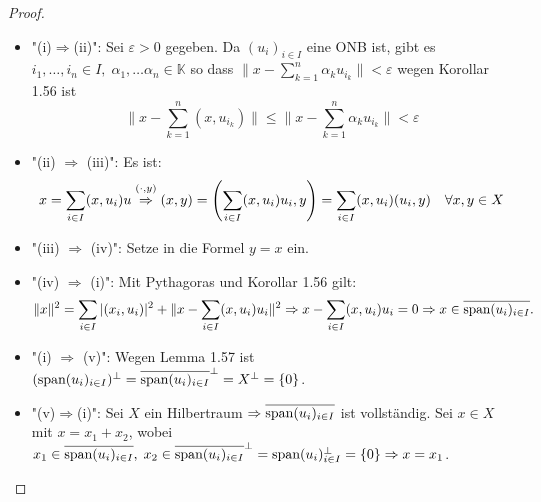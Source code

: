 \documentclass[ngerman]{report}
\theoremstyle{plain}%
\theoremstyle{definition}%
\theoremstyle{myStyle}
\newcommand{\K}{\mathbb{K}}
\newcommand{\aufspan}{\textnormal{span}}
\newcommand{\norm}[1]{\|#1\|}
\newcommand{\df}[1][]{%
	\overset{#1}{\Rightarrow}
}
\newcommand{\qmarks}[1]{"#1"}
\begin{document}
	\begin{proof}
		\begin{itemize}[]
		\item \qmarks{(i)$\df$(ii)}: Sei $\varepsilon > 0$ gegeben. Da $(u_i)_{i\in I}$ eine ONB ist, gibt es $i_1,\dots,i_n\in I,\;\alpha_1,\dots \alpha_n \in \K$ so dass $\|x- \sum^n_{k=1} \alpha_k u_{i_k}\| < \varepsilon$ wegen Korollar 1.56 ist
		$$\|x- \sum^n_{k=1} (x, u_{i_k})\| \leq \|x-\sum^n_{k=1} \alpha_k u_{i_k}\| < \varepsilon$$
		\item \qmarks{(ii) $\df$ (iii)}: Es ist:
		$$x = \sum_{i\in I} (x, u_i)u \overset{(\cdot, y)}{\df} (x,y)=\left(\sum_{i\in I} (x, u_i)u_i,y\right)=\sum_{i\in I} (x,u_i)(u_i,y)\quad \forall x,y\in X$$
		\item \qmarks{(iii) $\df$ (iv)}: Setze in die Formel $y=x$ ein.
		\item \qmarks{(iv) $\df$ (i)}: Mit Pythagoras und Korollar 1.56 gilt:
		$$\|x\|^2 = \sum_{i\in I} |(x_i,u_i)|^2 + \|x- \sum_{i\in I} (x,u_i)u_i\|^2 \df x- \sum_{i\in I} (x,u_i)u_i = 0 \df x \in \overline{\aufspan (u_i)_{i\in I}}.$$
		\item \qmarks{(i) $\df$ (v)}: Wegen Lemma 1.57 ist $(\aufspan (u_i)_{i\in I})^\perp =\overline{\aufspan (u_i)_{i\in I}}^\perp = X^\perp = \{0\}$.
		\item \qmarks{(v)$\df$(i)}: Sei $X$ ein Hilbertraum $\df \overline{\aufspan (u_i)_{i\in I}}$ ist vollständig. Sei $x\in X$ mit $x = x_1+x_2$, wobei $x_1 \in \overline{\aufspan (u_i)_{i\in I}},\;x_2\in \overline{\aufspan (u_i)_{i\in I}}^\perp =  \aufspan (u_i)_{i\in I}^\perp = \{0\} \df x = x_1$.
		\end{itemize}
	\end{proof}
\end{document}
